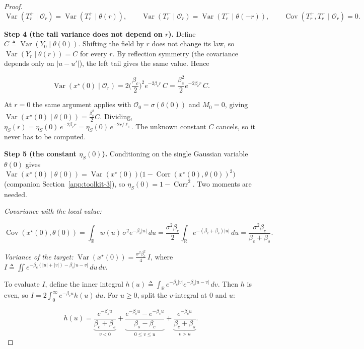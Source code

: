 \begin{proof}
\[
\operatorname{Var}(T_r^+\mid\mathcal O_r)=\operatorname{Var}(T_r^+\mid\theta(r)),\qquad \operatorname{Var}(T_r^-\mid\mathcal O_r)=\operatorname{Var}(T_r^-\mid\theta(-r)),\qquad \operatorname{Cov}(T_r^+,T_r^-\mid\mathcal O_r)=0 .
\]

\textbf{Step 4 (the tail variance does not depend on $r$).} Define $C\triangleq\operatorname{Var}(Y_0\mid\theta(0))$. Shifting the field by $r$ does not change its law, so $\operatorname{Var}(Y_r\mid\theta(r))=C$ for every $r$. By reflection symmetry (the covariance depends only on $|u-u'|$), the left tail gives the same value. Hence

\[
\operatorname{Var}(x^\star(0)\mid\mathcal O_r)=2\Big(\frac{\beta_c}{2}\Big)^2e^{-2\beta_c r}\,C=\frac{\beta_c^2}{2}e^{-2\beta_c r}\,C .
\]

At $r=0$ the same argument applies with $\mathcal O_0=\sigma(\theta(0))$ and $M_0=0$, giving $\operatorname{Var}(x^\star(0)\mid\theta(0))=\tfrac{\beta_c^2}{2}C$. Dividing, $\eta_S(r)=\eta_S(0)\,e^{-2\beta_c r}=\eta_S(0)\,e^{-2r/\ell_c}$. The unknown constant $C$ cancels, so it never has to be computed.

\textbf{Step 5 (the constant $\eta_S(0)$).} Conditioning on the single Gaussian variable $\theta(0)$ gives $\operatorname{Var}(x^\star(0)\mid\theta(0))=\operatorname{Var}(x^\star(0))\big(1-\operatorname{Corr}(x^\star(0),\theta(0))^2\big)$ (companion Section~\ref{app:toolkit-3}), so $\eta_S(0)=1-\operatorname{Corr}^2$. Two moments are needed.

\emph{Covariance with the local value:}

\[
\operatorname{Cov}(x^\star(0),\theta(0))=\int_{\mathbb R}w(u)\,\sigma^2e^{-\beta_s|u|}\,du=\frac{\sigma^2\beta_c}{2}\int_{\mathbb R}e^{-(\beta_c+\beta_s)|u|}\,du=\frac{\sigma^2\beta_c}{\beta_c+\beta_s}.
\]

\emph{Variance of the target:} $\operatorname{Var}(x^\star(0))=\frac{\sigma^2\beta_c^2}{4}\,I$, where $I\triangleq\iint e^{-\beta_c(|u|+|v|)-\beta_s|u-v|}\,du\,dv$.

To evaluate $I$, define the inner integral $h(u)\triangleq\int_{\mathbb R}e^{-\beta_c|v|}e^{-\beta_s|u-v|}\,dv$. Then $h$ is even, so $I=2\int_0^\infty e^{-\beta_c u}h(u)\,du$. For $u\ge0$, split the $v$-integral at $0$ and $u$:

\[
h(u)=\underbrace{\frac{e^{-\beta_s u}}{\beta_c+\beta_s}}_{v<0}+\underbrace{\frac{e^{-\beta_c u}-e^{-\beta_s u}}{\beta_s-\beta_c}}_{0\le v\le u}+\underbrace{\frac{e^{-\beta_c u}}{\beta_c+\beta_s}}_{v>u}.
\]


\end{proof}

